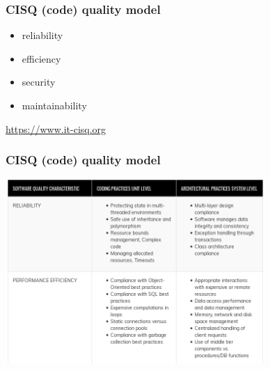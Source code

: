 \documentclass[17pt,aspectratio=169,hyperref=pdfusetitle]{beamer}
\begin{document}


\begin{frame}[fragile]
  \frametitle{CISQ (code) quality model}
  
  \begin{itemize}
  \item reliability
  \item efficiency
  \item security
  \item maintainability
  \end{itemize}

  \begin{flushright}
    \url{https://www.it-cisq.org}
  \end{flushright}
  
\end{frame}

\begin{frame}[fragile]
  \frametitle{CISQ (code) quality model}

  \begin{center}
  \includegraphics[height=7cm]{figs/cisq}
  \end{center}  
  
\end{frame}
\end{document}
